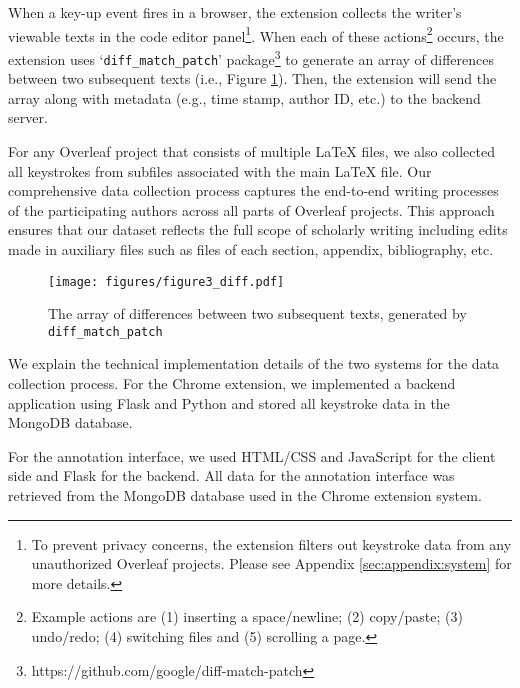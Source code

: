 When a key-up event fires in a browser, the extension collects the writer's viewable texts in the code editor panel\footnote{To prevent privacy concerns, the extension filters out keystroke data from any unauthorized Overleaf projects. Please see Appendix \ref{sec:appendix:system} for more details.}. When each of these actions\footnote{Example actions are (1) inserting a space/newline; (2) copy/paste; (3) undo/redo; (4) switching files and (5) scrolling a page.} occurs, the extension uses `\texttt{diff\_match\_patch}' package\footnote{https://github.com/google/diff-match-patch} to generate an array of differences between two subsequent texts (i.e., Figure \ref{fig:system-diff}). Then, the extension will send the array along with metadata (e.g., time stamp, author ID, etc.) to the backend server. 

For any Overleaf project that consists of multiple LaTeX files, we also collected all keystrokes from subfiles associated with the main LaTeX file. Our comprehensive data collection process captures the end-to-end writing processes of the participating authors across all parts of Overleaf projects. This approach ensures that our dataset reflects the full scope of scholarly writing including edits made in auxiliary files such as files of each section, appendix, bibliography, etc. 

\begin{figure}[ht!]
    \centering
    {\texttt{[image: figures/figure3\_diff.pdf]}}
    \caption{The array of differences between two subsequent texts, generated by \texttt{diff\_match\_patch}}
    \label{fig:system-diff}
\end{figure}


We explain the technical implementation details of the two systems for the data collection process. For the Chrome extension, we implemented a backend application using Flask and Python and stored all keystroke data in the MongoDB database. 

For the annotation interface, we used HTML/CSS and JavaScript for the client side and Flask for the backend. All data for the annotation interface was retrieved from the MongoDB database used in the Chrome extension system. 

